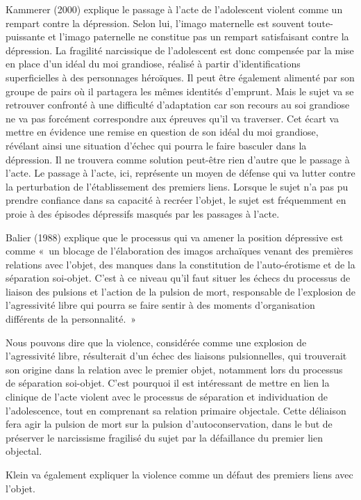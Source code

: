\documentclass[12pt, a4paper]{book}
\begin{document}
\begin{spacing}{1.5}
Kammerer (2000) explique le passage à l'acte de l'adolescent violent comme un  rempart contre la dépression. Selon lui, l'imago maternelle est souvent toute-puissante et l'imago paternelle ne constitue pas un rempart satisfaisant contre la dépression. La fragilité narcissique de l'adolescent est donc compensée par la mise en place d'un idéal du moi grandiose, réalisé à partir d'identifications superficielles à des personnages héroïques. Il peut être également alimenté par son groupe de pairs où il partagera les mêmes identités d'emprunt. Mais le sujet va se retrouver confronté à une difficulté d'adaptation car son recours au soi grandiose ne va pas forcément correspondre aux épreuves qu'il va traverser. Cet écart va mettre en évidence une remise en question de son idéal du moi grandiose, révélant ainsi une situation d'échec qui pourra le faire basculer dans la dépression. Il ne trouvera comme solution peut-être rien d'autre que le passage à l'acte. Le passage à l'acte, ici, représente un moyen de défense qui va lutter contre la perturbation de l'établissement des premiers liens. Lorsque le sujet n'a pas pu prendre confiance dans sa capacité à recréer l'objet, le sujet est fréquemment en proie à des épisodes dépressifs masqués par les passages à l'acte.

Balier (1988) explique que le processus qui va amener la position dépressive est comme « un blocage de l'élaboration des imagos archaïques venant des premières relations avec l'objet, des manques dans la constitution de l'auto-érotisme et de la séparation soi-objet. C'est à ce niveau qu'il faut situer les échecs du processus de liaison des pulsions et l'action de la pulsion de mort, responsable de l'explosion de l'agressivité libre qui pourra se faire sentir à des moments d'organisation différents de la personnalité. » 

Nous pouvons dire que la violence, considérée comme une explosion de l'agressivité libre, résulterait d'un échec des liaisons pulsionnelles, qui trouverait son origine dans la relation avec le premier objet, notamment lors du processus de séparation soi-objet. C'est pourquoi il est intéressant de mettre en lien la clinique de l'acte violent avec le processus de séparation et individuation de l'adolescence, tout en comprenant sa relation primaire objectale. Cette déliaison fera agir la pulsion de mort sur la pulsion d'autoconservation, dans le but de préserver le narcissisme fragilisé du sujet par la défaillance du premier lien objectal.

Klein va également expliquer la violence comme un défaut des premiers liens avec l'objet. 


\end{spacing}
\end{document}
